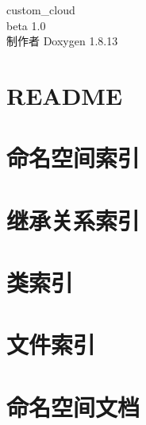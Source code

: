 \documentclass[twoside]{book}
\newcommand{\+}{\discretionary{\mbox{\scriptsize$\hookleftarrow$}}{}{}}
\newcommand{\clearemptydoublepage}{%
  \newpage{\pagestyle{empty}\cleardoublepage}%
}
\begin{document}
\hypersetup{pageanchor=false,
             bookmarksnumbered=true,
             pdfencoding=unicode
            }
\begin{titlepage}
\vspace*{7cm}
\begin{center}%
{\Large custom\+\_\+cloud \\[1ex]\large beta 1.\+0 }\\
\vspace*{1cm}
{\large 制作者 Doxygen 1.8.13}\\
\end{center}
\end{titlepage}
\clearemptydoublepage
{}
\tableofcontents
\clearemptydoublepage
{}
\hypersetup{pageanchor=true}

\chapter{R\+E\+A\+D\+ME}
\label{md__r_e_a_d_m_e}

\chapter{命名空间索引}

\chapter{继承关系索引}

\chapter{类索引}

\chapter{文件索引}

\chapter{命名空间文档}












\end{document}
